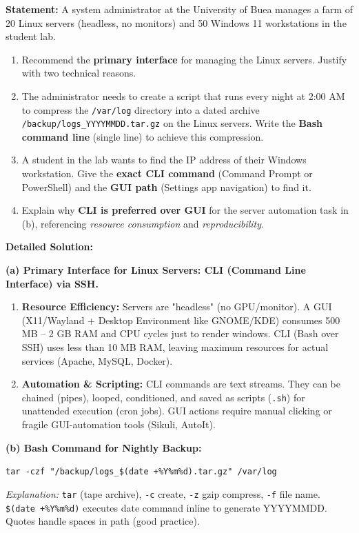 \documentclass[11pt]{article}
\newcommand{\cle}[1]{{\popxbold\color{popdark}#1}}
\begin{document}
\begin{exoresolu}
\textbf{Statement:} A system administrator at the University of Buea manages a farm of 20 Linux servers (headless, no monitors) and 50 Windows 11 workstations in the student lab.
\begin{enumerate}
    \item Recommend the \textbf{primary interface} for managing the Linux servers. Justify with two technical reasons.
    \item The administrator needs to create a script that runs every night at 2:00 AM to compress the \texttt{/var/log} directory into a dated archive \texttt{/backup/logs\_YYYYMMDD.tar.gz} on the Linux servers. Write the \textbf{Bash command line} (single line) to achieve this compression.
    \item A student in the lab wants to find the IP address of their Windows workstation. Give the \textbf{exact CLI command} (Command Prompt or PowerShell) and the \textbf{GUI path} (Settings app navigation) to find it.
    \item Explain why \textbf{CLI is preferred over GUI} for the server automation task in (b), referencing \emph{resource consumption} and \emph{reproducibility}.
\end{enumerate}
\tcblower
\textbf{Detailed Solution:}

\noindent\textbf{(a) Primary Interface for Linux Servers: \cle{CLI (Command Line Interface)} via SSH.}
\begin{enumerate}
    \item \textbf{Resource Efficiency:} Servers are "headless" (no GPU/monitor). A GUI (X11/Wayland + Desktop Environment like GNOME/KDE) consumes 500 MB -- 2 GB RAM and CPU cycles just to render windows. CLI (Bash over SSH) uses less than 10 MB RAM, leaving maximum resources for actual services (Apache, MySQL, Docker).
    \item \textbf{Automation \& Scripting:} CLI commands are text streams. They can be chained (pipes), looped, conditioned, and saved as scripts (\texttt{.sh}) for unattended execution (cron jobs). GUI actions require manual clicking or fragile GUI-automation tools (Sikuli, AutoIt).
\end{enumerate}

\noindent\textbf{(b) Bash Command for Nightly Backup:}

\texttt{tar -czf "/backup/logs\_\$(date +\%Y\%m\%d).tar.gz" /var/log}

\emph{Explanation:} \texttt{tar} (tape archive), \texttt{-c} create, \texttt{-z} gzip compress, \texttt{-f} file name. \texttt{\$(date +\%Y\%m\%d)} executes date command inline to generate YYYYMMDD. Quotes handle spaces in path (good practice).


\end{exoresolu}
\end{document}
